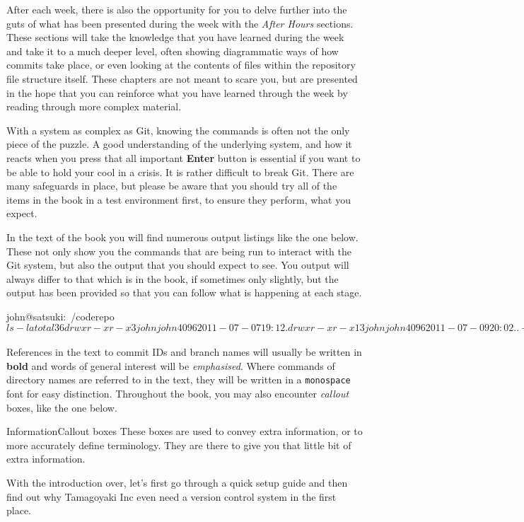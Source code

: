 After each week, there is also the opportunity for you to delve further into the guts of what has been presented during the week with the \emph{After Hours} sections.
These sections will take the knowledge that you have learned during the week and take it to a much deeper level, often showing diagrammatic ways of how commits take place, or even looking at the contents of files within the repository file structure itself.
These chapters are not meant to scare you, but are presented in the hope that you can reinforce what you have learned through the week by reading through more complex material.

With a system as complex as Git, knowing the commands is often not the only piece of the puzzle.
A good understanding of the underlying system, and how it reacts when you press that all important \textbf{Enter} button is essential if you want to be able to hold your cool in a crisis.
It is rather difficult to break Git.
There are many safeguards in place, but please be aware that you should try all of the items in the book in a test environment first, to ensure they perform, what you expect.

In the text of the book you will find numerous output listings like the one below.
These not only show you the commands that are being run to interact with the Git system, but also the output that you should expect to see.
You output will always differ to that which is in the book, if sometimes only slightly, but the output has been provided so that you can follow what is happening at each stage.

\begin{code}
john@satsuki:~/coderepo$ ls -la
total 36
drwxr-xr-x  3 john john 4096 2011-07-07 19:12 .
drwxr-xr-x 13 john john 4096 2011-07-09 20:02 ..
-rw-r--r--  1 john john   35 2011-07-07 19:12 another_file
-rw-r--r--  1 john john   25 2011-07-07 19:12 cont_dev
drwxrwxr-x  8 john john 4096 2011-07-07 19:17 .git
-rw-r--r--  1 john john    8 2011-03-31 22:15 temp_file
john@satsuki:~/coderepo$
\end{code}

References in the text to commit IDs and branch names will usually be written in \textbf{bold} and words of general interest will be \emph{emphasised}.
Where commands of directory names are referred to in the text, they will be written in a \texttt{monospace} font for easy distinction.
Throughout the book, you may also encounter \emph{callout} boxes, like the one below.

\begin{callout}{Information}{Callout boxes}
These boxes are used to convey extra information, or to more accurately define terminology.
They are there to give you that little bit of extra information.
\end{callout}

With the introduction over, let's first go through a quick setup guide and then find out why Tamagoyaki Inc even need a version control system in the first place.
